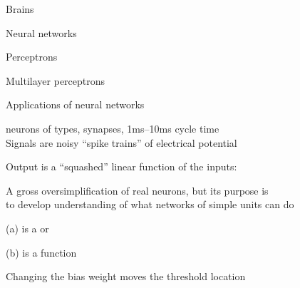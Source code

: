 \documentclass{article}
\begin{document}
\begin{huge}

\sf


\blob Brains

\blob Neural networks

\blob Perceptrons

\blob Multilayer perceptrons

\blob Applications of neural networks




 neurons of  types,  synapses, 1ms--10ms cycle time\\
Signals are noisy ``spike trains'' of electrical potential

\vspace*{0.2in}

\textwidth
{}



Output is a ``squashed'' linear function of the inputs:
\mat{\[
a_i \leftarrow g(in_i) = g\left(\mysum_j \w{j}{i} a_j\right)
\]}


\vspace*{0.2in}

\textwidth
{}

A gross oversimplification of real neurons, but its purpose is\\
to develop understanding of what networks of simple units can do



\vspace*{0.2in}

\textwidth
{}

(a) is a  or 

(b) is a  function 

Changing the bias weight  moves the threshold location






\end{huge}
\end{document}
